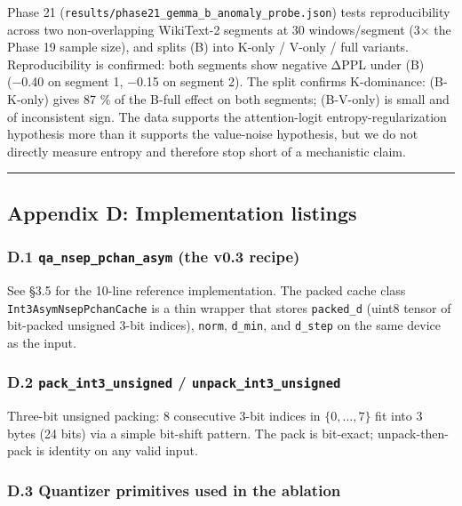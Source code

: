 Phase 21 (\texttt{results/phase21\_gemma\_b\_anomaly\_probe.json}) tests
reproducibility across two non-overlapping WikiText-2 segments at 30
windows/segment (3× the Phase 19 sample size), and splits (B) into
K-only / V-only / full variants. Reproducibility is confirmed: both
segments show negative ΔPPL under (B) (−0.40 on segment 1, −0.15 on
segment 2). The split confirms K-dominance: (B-K-only) gives 87 \% of
the B-full effect on both segments; (B-V-only) is small and of
inconsistent sign. The data supports the attention-logit
entropy-regularization hypothesis more than it supports the value-noise
hypothesis, but we do not directly measure entropy and therefore stop
short of a mechanistic claim.

\begin{center}\rule{0.5\linewidth}{0.5pt}\end{center}

\subsection{Appendix D: Implementation
listings}\label{appendix-d-implementation-listings}

\subsubsection{\texorpdfstring{D.1 \texttt{qa\_nsep\_pchan\_asym} (the
v0.3
recipe)}{D.1 qa\_nsep\_pchan\_asym (the v0.3 recipe)}}\label{d.1-qa_nsep_pchan_asym-the-v0.3-recipe}

See §3.5 for the 10-line reference implementation. The packed cache
class \texttt{Int3AsymNsepPchanCache} is a thin wrapper that stores
\texttt{packed\_d} (uint8 tensor of bit-packed unsigned 3-bit indices),
\texttt{norm}, \texttt{d\_min}, and \texttt{d\_step} on the same device
as the input.

\subsubsection{\texorpdfstring{D.2 \texttt{pack\_int3\_unsigned} /
\texttt{unpack\_int3\_unsigned}}{D.2 pack\_int3\_unsigned / unpack\_int3\_unsigned}}\label{d.2-pack_int3_unsigned-unpack_int3_unsigned}

Three-bit unsigned packing: 8 consecutive 3-bit indices in
\(\{0, \dots, 7\}\) fit into 3 bytes (24 bits) via a simple bit-shift
pattern. The pack is bit-exact; unpack-then-pack is identity on any
valid input.

\subsubsection{D.3 Quantizer primitives used in the
ablation}\label{d.3-quantizer-primitives-used-in-the-ablation}

